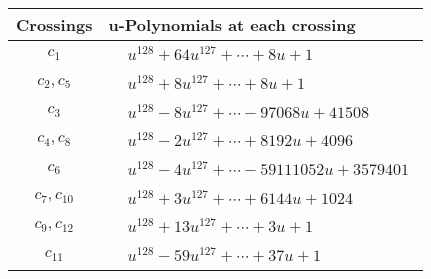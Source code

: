 \documentclass[1p]{elsarticle_modified}
\theoremstyle{definition}
\begin{document}
\begin{tabular}{m{50pt}|m{274pt}}
Crossings & \hspace{64pt}u-Polynomials at each crossing \\
\hline $$\begin{aligned}c_{1}\end{aligned}$$&$\begin{aligned}
&u^{128}+64 u^{127}+\cdots+8 u+1
\end{aligned}$\\
\hline $$\begin{aligned}c_{2},c_{5}\end{aligned}$$&$\begin{aligned}
&u^{128}+8 u^{127}+\cdots+8 u+1
\end{aligned}$\\
\hline $$\begin{aligned}c_{3}\end{aligned}$$&$\begin{aligned}
&u^{128}-8 u^{127}+\cdots-97068 u+41508
\end{aligned}$\\
\hline $$\begin{aligned}c_{4},c_{8}\end{aligned}$$&$\begin{aligned}
&u^{128}-2 u^{127}+\cdots+8192 u+4096
\end{aligned}$\\
\hline $$\begin{aligned}c_{6}\end{aligned}$$&$\begin{aligned}
&u^{128}-4 u^{127}+\cdots-59111052 u+3579401
\end{aligned}$\\
\hline $$\begin{aligned}c_{7},c_{10}\end{aligned}$$&$\begin{aligned}
&u^{128}+3 u^{127}+\cdots+6144 u+1024
\end{aligned}$\\
\hline $$\begin{aligned}c_{9},c_{12}\end{aligned}$$&$\begin{aligned}
&u^{128}+13 u^{127}+\cdots+3 u+1
\end{aligned}$\\
\hline $$\begin{aligned}c_{11}\end{aligned}$$&$\begin{aligned}
&u^{128}-59 u^{127}+\cdots+37 u+1
\end{aligned}$\\
\hline
\end{tabular}\\~\\
\end{document}
